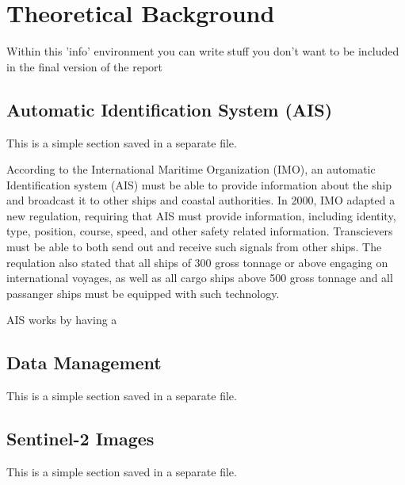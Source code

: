 \chapter{Theoretical Background}
\label{chp:theory}
\begin{info}
	Within this 'info' environment you can write stuff you don't want to be included in the final version of the report
\end{info}

\section{Automatic Identification System (AIS)}
\begin{info}{}
	This is a simple section saved in a separate file.
\end{info}
According to the International Maritime Organization (IMO), an automatic Identification system (AIS) must be able to provide information about the ship and broadcast it to other ships and coastal authorities. In 2000, IMO adapted a new regulation, requiring that AIS must provide information, including identity, type, position, course, speed, and other safety related information. Transcievers must be able to both send out and receive such signals from other ships.  The requlation also stated that all ships of 300 gross tonnage or above engaging on international voyages, as well as all cargo ships above 500 gross tonnage and all passanger ships must be equipped with such technology. 


AIS works by having a 



\section{Data Management}
\begin{info}{}
	This is a simple section saved in a separate file.
\end{info}



\section{Sentinel-2 Images}
\begin{info}{}
	This is a simple section saved in a separate file.
\end{info}



